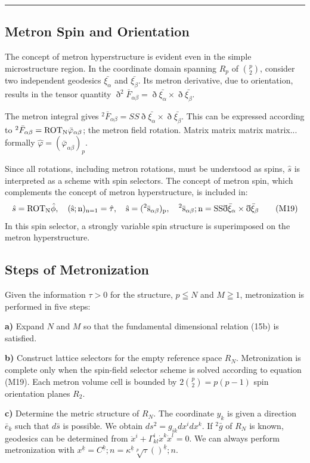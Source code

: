 \documentclass[11pt,a4paper,oneside]{article}
\newcommand{\ethop}{\eth}
\newcommand{\hr}{\par\vspace{2em}\noindent\rule{\linewidth}{0.4pt}\par\vspace{2em}}
\begin{document}
\hr

\subsection{Metron Spin and Orientation}
The concept of metron hyperstructure is evident even in the simple microstructure region. In the coordinate domain spanning $R_p$ of $\binom{p}{2}$, consider two independent geodesics $\bar{\xi_\alpha}$ and $\bar{\xi_\beta}$. Its metron derivative, due to orientation, results in the tensor quantity $\ethop^2\bar {F}_{\alpha\beta} = \ethop\bar {\xi_\alpha}\times\ethop\bar {\xi_\beta}$.

The metron integral gives ${}^2\bar {F}_{\alpha\beta} = SS\ethop\bar {\xi_\alpha}\times\ethop\bar {\xi_\beta}$. This can be expressed according to ${}^2\bar {F}_{\alpha\beta} = \rm{ROT}_N\bar {\varphi}_{\alpha\beta}$; the metron field rotation. Matrix matrix matrix matrix... formally $\hat {\varphi} =(\bar {\varphi}_{\alpha\beta})_p$.

Since all rotations, including metron rotations, must be understood as spins, $\hat{s}$ is interpreted as a scheme with spin selectors. The concept of metron spin, which complements the concept of metron hyperstructure, is included in:
\begin{equation}
    \hat {s} = \rm{ROT}_N\hat {\phi}, \quad(\hat {s}; n)_{n = 1} =\hat{\tau}, \quad\hat{s} =({}^2\bar{s}_{\alpha\beta})_p, \quad {}^2\bar {s}_{\alpha\beta}; n = SS \ethop\bar {\xi}_\alpha\times \ethop\bar {\xi}_\beta \tag{M19}
\end{equation}
In this spin selector, a strongly variable spin structure is superimposed on the metron hyperstructure.

\subsection{Steps of Metronization}
Given the information $\tau > 0$ for the structure, $p \leqq N$ and $M \geqq 1$, metronization is performed in five steps:

\textbf{a)} Expand $N$ and $M$ so that the fundamental dimensional relation (15b) is satisfied.

\textbf{b)} Construct lattice selectors for the empty reference space $R_N$. Metronization is complete only when the spin-field selector scheme is solved according to equation (M19). Each metron volume cell is bounded by $2\binom{p}{2} = p(p-1)$ spin orientation planes $R_2$.

\textbf{c)} Determine the metric structure of $R_N$. The coordinate $y_k$ is given a direction $\bar{e}_k$ such that $d\bar{s}$ is possible. We obtain $ds^2 = g_{ik} dx^idx^k$. If ${}^2\bar{g}$ of $R_N$ is known, geodesics can be determined from $\ddot{x}^i +\Gamma^i_{kl}\dot{x}^k\dot{x}^l = 0$.
We can always perform metronization with $x^{\underline {k}} = C^{\underline {k}};n =\kappa^{\underline {k}}\sqrt [p] {\tau}()^{\underline {k}};n$.
\end{document}

